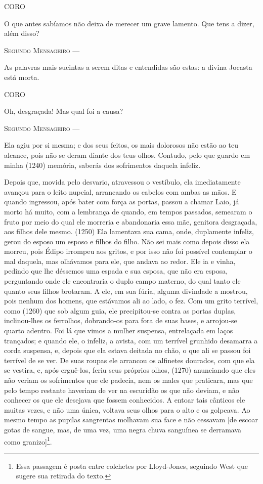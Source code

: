 \textsc{CORO}

O que antes sabíamos não deixa de merecer um grave lamento. Que tens a
dizer, além disso?

\textsc{Segundo Mensageiro} ---

As palavras mais sucintas a serem ditas e entendidas são estas: a divina
Jocasta está morta.

\textsc{CORO}

Oh, desgraçada! Mas qual foi a causa?

\textsc{Segundo Mensageiro} ---

Ela agiu por si mesma; e dos seus feitos, os mais dolorosos não estão ao
teu alcance, pois não se deram diante dos teus olhos. Contudo, pelo que
guardo em minha (1240) memória, saberás dos sofrimentos daquela infeliz.

Depois que, movida pelo desvario, atravessou o vestíbulo, ela
imediatamente avançou para o leito nupcial, arrancando os cabelos com
ambas as mãos. E quando ingressou, após bater com força as portas,
passou a chamar Laio, já morto há muito, com a lembrança de quando, em
tempos passados, semearam o fruto por meio do qual ele morreria e
abandonaria essa mãe, genitora desgraçada, aos filhos dele mesmo. (1250)
Ela lamentava sua cama, onde, duplamente infeliz, gerou do esposo um
esposo e filhos do filho. Não sei mais como depois disso ela morreu,
pois Édipo irrompeu aos gritos, e por isso não foi possível contemplar o
mal daquela, mas olhávamos para ele, que andava ao redor. Ele ia e
vinha, pedindo que lhe déssemos uma espada e sua esposa, que não era
esposa, perguntando onde ele encontraria o duplo campo materno, do qual
tanto ele quanto seus filhos brotaram. A ele, em sua fúria, alguma
divindade a mostrou, pois nenhum dos homens, que estávamos ali ao lado,
o fez. Com um grito terrível, como (1260) que sob algum guia, ele
precipitou-se contra as portas duplas, inclinou-lhes os ferrolhos,
dobrando-os para fora de suas bases, e arrojou-se quarto adentro. Foi lá
que vimos a mulher suspensa, entrelaçada em laços trançados; e quando
ele, o infeliz, a avista, com um terrível grunhido desamarra a corda
suspensa, e, depois que ela estava deitada no chão, o que ali se passou
foi terrível de se ver. De suas roupas ele arrancou os alfinetes
dourados, com que ela se vestira, e, após erguê-los, feriu seus próprios
olhos, (1270) anunciando que eles não veriam os sofrimentos que ele
padecia, nem os males que praticara, mas que pelo tempo restante
haveriam de ver na escuridão os que não deviam, e não conhecer os que
ele desejava que fossem conhecidos. A entoar tais cânticos ele muitas
vezes, e não uma única, voltava seus olhos para o alto e os golpeava. Ao
mesmo tempo as pupilas sangrentas molhavam sua face e não cessavam {[}de
escoar gotas de sangue, mas, de uma vez, uma negra chuva sanguínea se
derramava como granizo{]}\footnote{Essa passagem é posta entre colchetes
  por Lloyd-Jones, seguindo West que sugere sua retirada do texto.}.

